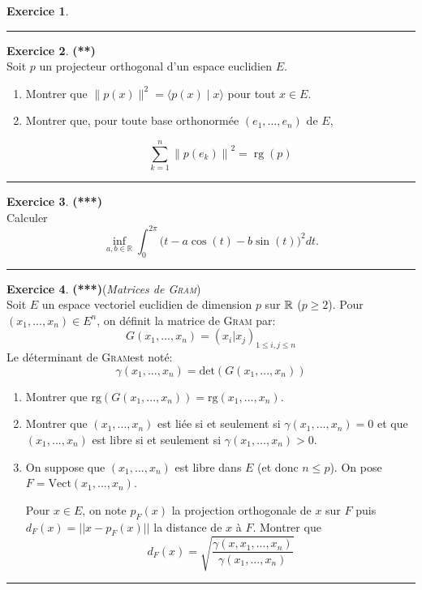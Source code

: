 \documentclass[a4paper,11pt]{article}
\theoremstyle{definition}
\newtheorem{exo}{Exercice} %
\begin{document}
\begin{minipage}{1\linewidth}
\begin{minipage}[t]{0.48\linewidth}
\begin{exo}
	\centering\rule{1\linewidth}{0.6pt}\end{exo}

\begin{exo}\textbf{(**)}\quad\\[0.2cm]
	
	Soit $p$ un projecteur orthogonal d'un espace euclidien $E$.

	\begin{enumerate}
		\item Montrer que $\|p(x)\|^{2}=\langle p(x) \mid x\rangle$ pour tout $x \in E$.
		\item  Montrer que, pour toute base orthonormée $\left(e_{1}, \ldots, e_{n}\right)$ de $E$,
		
		$$
		\sum_{k=1}^{n}\left\|p\left(e_{k}\right)\right\|^{2}=\operatorname{rg}(p)
		$$
	\end{enumerate}
	\centering\rule{1\linewidth}{0.6pt}\end{exo}



\end{minipage}\end{minipage} \newpage

\begin{exo}\textbf{(***)}\quad\\[0.2cm]
	Calculer $$\displaystyle \inf_{a,b\in\mathbb R}\int_0^{2\pi} \big(t-a\cos(t)-b\sin(t)\big)^2 dt.$$
	
	\centering\rule{1\linewidth}{0.6pt}\end{exo}

\begin{exo}\textbf{(***)}\quad  (\textit{Matrices de \textsc{Gram}})\\[0.2cm]
	Soit $E$ un espace vectoriel euclidien de dimension $p$ sur $\mathbb{R}$ ($p\geq2$).
	Pour $(x_1,...,x_n) \in E^n$, on définit la matrice de \textsc{Gram} par:  
	$$G(x_1,...,x_n)=(x_i|x_j)_{1\leq i,j\leq n}$$ 
	Le déterminant de \textsc{Gram}est noté: $$\gamma(x_1,...,x_n)=\mbox{det}(G(x_1 , ... , x_n))$$
	\begin{enumerate}
		\item  Montrer que $\mbox{rg}(G(x_1,...,x_n))=\mbox{rg}(x_1, ... ,x_n)$.
		\item  Montrer que $(x_1,...,x_n)$ est liée si et seulement si $\gamma(x_1,...,x_n)=0$ et que $(x_1,...,x_n)$ est libre si et seulement si $\gamma(x_1,...,x_n)>0$.
		\item  On suppose que $(x_1,...,x_n)$ est libre dans $E$ (et donc $n\leq p$). On pose $F=\mbox{Vect}(x_1,...,x_n)$.
		
		Pour $x\in E$, on note $p_F(x)$ la projection orthogonale de $x$ sur $F$ puis $d_F(x)=||x-p_F(x)||$ la distance de $x$ à $F$. Montrer que $$d_F(x)=\sqrt{\frac{\gamma(x,x_1,...,x_n)}{\gamma(x_1,...,x_n)}}$$
	\end{enumerate}
	
	\centering\rule{1\linewidth}{0.6pt}\end{exo}
\end{document}
